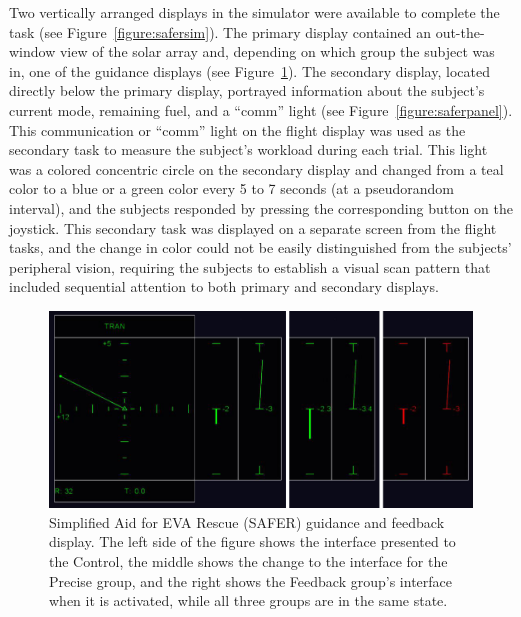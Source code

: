 Two vertically arranged displays in the simulator were available to complete the task (see Figure~\ref{figure:safersim}).
The primary display contained an out-the-window view of the solar array and, depending on which group the subject was in, one of the guidance displays (see Figure~\ref{figure:safergroups}).
The secondary display, located directly below the primary display, portrayed information about the subject's current mode, remaining fuel, and a ``comm'' light (see Figure~\ref{figure:saferpanel}).
This communication or ``comm'' light on the flight display was used as the secondary task to measure the subject's workload during each trial.
This light was a colored concentric circle on the secondary display and changed from a teal color to a blue or a green color every 5 to 7 seconds (at a pseudorandom interval), and the subjects responded by pressing the corresponding button on the joystick.
This secondary task was displayed on a separate screen from the flight tasks, and the change in color could not be easily distinguished from the subjects' peripheral vision, requiring the subjects to establish a visual scan pattern that included sequential attention to both primary and secondary displays.

\begin{figure}[tbp]
    \begin{center}
        \includegraphics[width=\linewidth]{figures/Introduction/SAFERGroups.png}
        \caption[Simplified Aid for EVA Rescue (SAFER) guidance and feedback display]{Simplified Aid for EVA Rescue (SAFER) guidance and feedback display. The left side of the figure shows the interface presented to the Control, the middle shows the change to the interface for the Precise group, and the right shows the Feedback group's interface when it is activated, while all three groups are in the same state.}
        \label{figure:safergroups}
    \end{center}
\end{figure}

